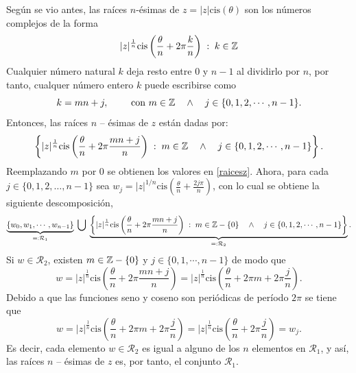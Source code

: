 \begin{prueba}
    Seg\'un se vio antes, las ra\'ices $n$-\'esimas de 
    $z = |z| \mbox{cis}(\theta)$ son los
    n\'umeros complejos de la forma
    \[
       |z|^{\frac 1 n} 
            \mbox{cis}\left(\frac{\theta}{n} + 2 \pi \frac{k}{n}
            \right)\;:\; k \in \mathbb{Z}
    \]
    Cualquier n\'umero natural $k$ deja resto entre 0 y $n-1$ al dividirlo por $n$, por tanto,
    cualquer n\'umero entero $k$ puede escribirse
    como 
    \[
        k = m n + j,\qquad \mbox{ con } m \in \mathbb{Z} \quad \wedge \quad j \in \{0,1,2,\cdots,n-1\}.
    \]
    Entonces, las ra\'ices $n$ -- \'esimas de $z$ están dadas por:
    \[
        \left\{|z|^{\frac 1 n} \mbox{cis}\left(\frac{\theta}{n} + 
            2 \pi \frac{m n+j}{n}\right)\;:\;m \in \mathbb{Z} \quad \wedge \quad j \in \{0,1,2,\cdots,n-1\}\right\}.
    \]
    Reemplazando $m$ por $0$ se obtienen los valores en \eqref{raicesz}. 
    Ahora, para cada $j \in \{0,1,2,\ldots,n-1\}$ sea 
    $w_j = |z|^{1/n} \mbox{cis}\left(\frac{\theta}{n} + \frac{2 j \pi}{n}\right)$,
    con lo cual se obtiene la siguiente descomposici\'on,
    \[
            \underbrace{\left\{w_0,  w_1,  \cdots,  w_{n-1}\right\}}_{=: {\mathcal R}_1}
            \;\bigcup\; 
            \underbrace{\left\{|z|^{\frac 1 n} \mbox{cis}\left(\frac{\theta}{n} + 
            2 \pi \frac{m n+j}{n}\right)\;:\; m \in \mathbb{Z}-\{0\} \quad \wedge \quad
            j \in \{0,1,2,\cdots,n-1\}\right\}}_{=: {\mathcal R}_2}.
    \]    
    Si $w \in {\mathcal R}_2$, existen $m \in \mathbb{Z}-\{0\}$ y $j \in \{0,1,\cdots,n-1\}$
    de modo que 
    \[
       w = |z|^{\frac 1 n} \mbox{cis}\left(\frac{\theta}{n} + 
            2 \pi \frac{m n+j}{n}\right)
            =
            |z|^{\frac 1 n} \mbox{cis}\left(\frac{\theta}{n} + 2 \pi m + 2 \pi \frac{j}{n}\right).
    \]
    Debido a que las funciones seno y coseno son peri\'odicas de per\'iodo
    $2 \pi$ se tiene que 
    \[
        w = |z|^{\frac 1 n} \mbox{cis}\left(\frac{\theta}{n} + 2 \pi m + 2 \pi \frac{j}{n}\right)
        = |z|^{\frac 1 n} \mbox{cis}\left(\frac{\theta}{n} + 2 \pi \frac{j}{n}\right)
        = w_j.
    \]
    Es decir, cada elemento $w \in {\mathcal R}_2$ es igual a alguno de los $n$ elementos
    en ${\mathcal R}_1$, y as\'i, las ra\'ices $n$ -- \'esimas de $z$ es,
    por tanto, el conjunto ${\mathcal R}_1$.   
\end{prueba}



